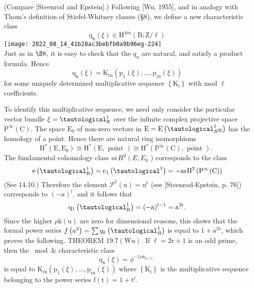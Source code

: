 \documentclass[10pt]{article}
\begin{document}
(Compare [Steenrod and Epstein].) Following [Wu, 1955], and in analogy with Thom's definition of Stiefel-Whitney classes (§8), we define a new characteristic class
$$
\mathrm{q}_{\mathrm{n}}(\xi) \in \mathrm{H}^{4 \mathrm{rn}}(\mathrm{B} ; \mathrm{Z} / \ell)
$$
\texttt{[image: 2022\_08\_14\_41b28ac3bebfb0a9b96eg-224]}\\
Just as in $\S 8$, it is easy to check that the $q_{n}$ are natural, and satisfy a product formula. Hence
$$
\mathrm{q}_{\mathrm{n}}(\xi)=\mathrm{K}_{\mathrm{rn}}\left(\mathrm{p}_{1}(\xi), \ldots, \mathrm{p}_{\mathrm{rn}}(\xi)\right)
$$
for some uniquely determined multiplicative sequence $\left\{\mathrm{K}_{\mathrm{i}}\right\}$ with mod $\ell$ coefficients.

To identify this multiplicative sequence, we need only consider the particular vector bundle $\xi=\tautological_{\mathrm{R}}^{1}$ over the infinite complex projective space $\mathrm{P}^{\infty}(\mathrm{C})$. The space $\mathrm{E}_{0}$ of non-zero vectors in $\mathrm{E}=\mathrm{E}\left(\tautological_{R}^{1}{ }_{\mathrm{R}}\right)$ has the homology of a point. Hence there are natural ring isomorphisms
$$
\mathrm{H}^{*}\left(\mathrm{E}, \mathrm{E}_{0}\right) \cong \mathrm{H}^{*}(\mathrm{E}, \text { point }) \cong \mathrm{H}^{*}\left(\mathrm{P}^{\infty}(\mathrm{C}), \text { point }\right) \text {. }
$$
The fundamental cohomology class $u \epsilon H^{2}\left(E, E_{0}\right.$ ) corresponds to the class
$$
\mathrm{e}\left(\tautological_{\mathrm{R}}^{1}\right)=\mathrm{c}_{1}\left(\tautological^{1}\right)=-\mathrm{a} \epsilon \mathrm{H}^{2}\left(\mathrm{P}^{\infty}(\mathrm{C})\right)
$$
(See 14.10.) Therefore the element $\mathscr{P}^{1}(\mathrm{u})=\mathrm{u}^{\ell}$ (see [Steenrod-Epstein, p. 76]) corresponds to $(-a)^{l}$, and it follows that
$$
\mathrm{q}_{1}\left(\tautological_{\mathrm{R}}^{1}\right)=(-\mathrm{a})^{l-1}=\mathrm{a}^{2 \mathrm{r}} .
$$
Since the higher $\rho \mathrm{k}(\mathrm{u})$ are zero for dimensional reasons, this shows that the formal power series $f\left(a^{2}\right)=\sum q_{k}\left(\tautological_{R}^{1}\right)$ is equal to $1+a^{2 r}$, which proves the following. THEOREM $19.7(\mathrm{Wu})$. If $\ell=2 \mathrm{r}+1$ is an odd prime, then the $\bmod \&$ characteristic class
$$
\mathrm{q}_{\mathrm{n}}(\xi)=\phi^{-1 \rho \mathrm{n}_{\phi(1)}}
$$
is equal to $\mathrm{K}_{\mathrm{rn}}\left(\mathrm{p}_{1}(\xi), \ldots, \mathrm{p}_{\mathrm{rn}}(\xi)\right)$ where $\left\{\mathrm{K}_{\mathrm{i}}\right\}$ is the multiplicative sequence belonging to the power series $\mathrm{f}(\mathrm{t})=1+\mathrm{t}^{\mathrm{r}}$.
\end{document}
